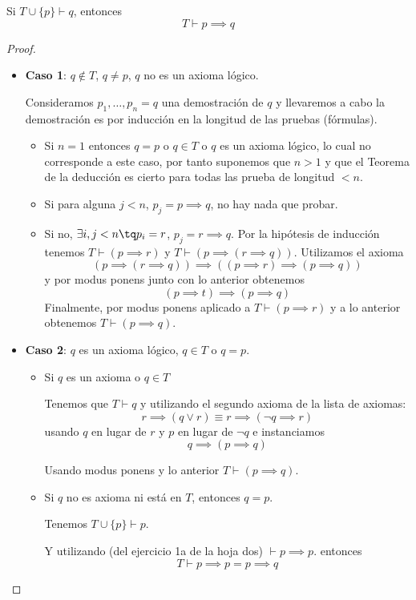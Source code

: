 \begin{theorem}
	Si $T\cup\{p\}\vdash q$, entonces $$T\vdash p\implies q$$
\end{theorem}
\begin{proof}
	\begin{itemize}
		\item \textbf{Caso 1}: $q\notin T$, $q\neq p$, $q$ no es un axioma lógico.

		Consideramos $p_1,\hdots, p_n=q$ una demostración de $q$ y llevaremos a cabo la demostración es por inducción en la longitud de las pruebas (fórmulas).

		\begin{itemize}
			\item Si $n=1$ entonces $q=p$ o $q\in T$ o $q$ es un axioma lógico, lo cual no corresponde a este caso, por tanto suponemos que $n>1$ y que el Teorema de la deducción es cierto para todas las prueba de longitud $<n$.
			\item Si para alguna $j<n$, $p_j = p\implies q$, no hay nada que probar.
			\item Si no, $\exists i,j<n \tq p_i=r$, $p_j=r\implies q$. Por la hipótesis de inducción tenemos $T\vdash (p\implies r)$ y $T\vdash (p\implies (r\implies q))$.
			Utilizamos el axioma
			$$(p\implies (r\implies q)) \implies ((p\implies r)\implies (p\implies q))$$
			y por modus ponens junto con lo anterior obtenemos
			$$(p\implies t)\implies (p\implies q)$$
			Finalmente, por modus ponens aplicado a $T\vdash (p\implies r)$ y a lo anterior obtenemos $T\vdash (p\implies q)$.
		\end{itemize}
	\item \textbf{Caso 2}: $q$ es un axioma lógico, $q\in T$ o $q=p$.

	\begin{itemize}
		\item Si $q$ es un axioma o $q\in T$

		Tenemos que $T\vdash q$ y utilizando el segundo axioma de la lista de axiomas:
		$$r\implies (q \vee r) \equiv r\implies (\neg q \implies r)$$ usando $q$ en lugar de $r$ y $p$ en lugar de $\neg q$ e instanciamos
		$$q\implies(p\implies q)$$

		Usando modus ponens y lo anterior
		$T\vdash (p\implies q)$.

		\item Si $q$ no es axioma ni está en $T$, entonces $q = p$.

		Tenemos $T\cup\{p\}\vdash p$.

		Y utilizando (del ejercicio 1a de la hoja dos) $\vdash p\implies p$.
		entonces $$T\vdash p\implies p = p\implies q$$
	\end{itemize}
	\end{itemize}
\end{proof}
